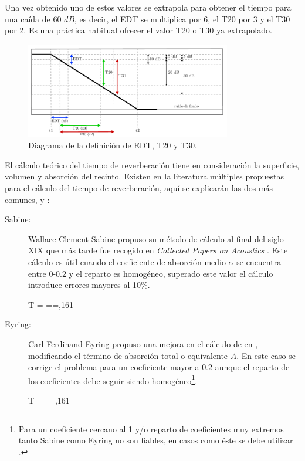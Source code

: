 Una vez obtenido uno de estos valores se extrapola para obtener el tiempo para una caída de 60 $dB$, es decir, el EDT se multiplica por 6, el T20 por 3 y el T30 por 2. Es una práctica habitual ofrecer el valor T20 o T30 ya extrapolado.

\begin{figure}[ht]
    \centering
    \includegraphics[width=0.8\textwidth]{archivos/EDT2030.pdf}
    \caption{Diagrama de la definición de EDT, T20 y T30.}
\end{figure}
\FloatBarrier

El cálculo teórico del tiempo de reverberación tiene en consideración la superficie, volumen y absorción del recinto. Existen en la literatura múltiples propuestas para el cálculo del tiempo de reverberación, aquí se explicarán las dos más comunes, \citeauthor{Sabine1922} y \citeauthor{Eyring1930}:

\begin{description}
	\item [Sabine:] Wallace Clement Sabine propuso su método de cálculo al final del siglo XIX que más tarde fue recogido en \textit{Collected Papers on Acoustics} \citep{Sabine1922}. Este cálculo es útil cuando el coeficiente de absorción medio $\overline{\alpha}$ se encuentra entre $0$-$0.2$ y el reparto es homogéneo, superado este valor el cálculo introduce errores mayores al 10\%.
		\begin{flalign}\label{eq:sabine}
			T = ==,161
		\end{flalign}
	
	\item [Eyring:] Carl Ferdinand Eyring propuso una mejora en el cálculo de \citeauthor{Sabine1922} en \cite{Eyring1930}, modificando el término de absorción total o equivalente $A$. En este caso se corrige el problema para un coeficiente mayor a $0.2$ aunque el reparto de los coeficientes debe seguir siendo homogéneo\footnote{Para un coeficiente cercano al 1 y/o  reparto de coeficientes muy extremos tanto Sabine como Eyring no son fiables, en casos como éste se debe utilizar \cite{Millington1932}.}. 
		\begin{flalign}\label{eq:eyring}
			T =  = ,161
		\end{flalign}
\end{description}

